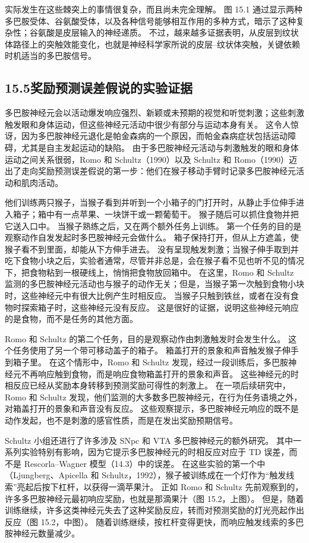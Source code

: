 \documentclass[UTF8,12pt,a4paper,fontset=fandol]{ctexart}
\begin{document}
实际发生在这些棘突上的事情很复杂，而且尚未完全理解。
图 15.1 通过显示两种多巴胺受体、谷氨酸受体，以及各种信号能够相互作用的多种方式，暗示了这种复杂性；谷氨酸是皮层输入的神经递质。
不过，越来越多证据表明，从皮层到纹状体路径上的突触效能变化，也就是神经科学家所说的皮层--纹状体突触，关键依赖时机适当的多巴胺信号。

\subsection*{15.5\quad 奖励预测误差假说的实验证据}

多巴胺神经元会以活动爆发响应强烈、新颖或未预期的视觉和听觉刺激；这些刺激触发眼和身体运动，但这些神经元活动中很少有部分与运动本身有关。
这令人惊讶，因为多巴胺神经元退化是帕金森病的一个原因，而帕金森病症状包括运动障碍，尤其是自主发起运动的缺陷。
由于多巴胺神经元活动与刺激触发的眼和身体运动之间关系很弱，Romo 和 Schultz（1990）以及 Schultz 和 Romo（1990）迈出了走向奖励预测误差假说的第一步：他们在猴子移动手臂时记录多巴胺神经元活动和肌肉活动。

他们训练两只猴子，当猴子看到并听到一个小箱子的门打开时，从静止手位伸手进入箱子；箱中有一点苹果、一块饼干或一颗葡萄干。
猴子随后可以抓住食物并把它送入口中。
当猴子熟练之后，又在两个额外任务上训练。
第一个任务的目的是观察动作自发发起时多巴胺神经元会做什么。
箱子保持打开，但从上方遮盖，使猴子看不到里面，却能从下方伸手进去。
没有呈现触发刺激；当猴子伸手取到并吃下食物小块之后，实验者通常，尽管并非总是，会在猴子看不见也听不见的情况下，把食物粘到一根硬线上，悄悄把食物放回箱中。
在这里，Romo 和 Schultz 监测的多巴胺神经元活动也与猴子的动作无关；但是，当猴子第一次触到食物小块时，这些神经元中有很大比例产生时相反应。
当猴子只触到铁丝，或者在没有食物时探索箱子时，这些神经元没有反应。
这是很好的证据，说明这些神经元响应的是食物，而不是任务的其他方面。

Romo 和 Schultz 的第二个任务，目的是观察动作由刺激触发时会发生什么。
这个任务使用了另一个带可移动盖子的箱子。
箱盖打开的景象和声音触发猴子伸手到箱子里。
在这个情形中，Romo 和 Schultz 发现，经过一段训练后，多巴胺神经元不再响应触到食物，而是响应食物箱盖打开的景象和声音。
这些神经元的时相反应已经从奖励本身转移到预测奖励可得性的刺激上。
在一项后续研究中，Romo 和 Schultz 发现，他们监测的大多数多巴胺神经元，在行为任务语境之外，对箱盖打开的景象和声音没有反应。
这些观察提示，多巴胺神经元响应的既不是动作发起，也不是刺激的感官性质，而是在发出奖励预期信号。

Schultz 小组还进行了许多涉及 SNpc 和 VTA 多巴胺神经元的额外研究。
其中一系列实验特别有影响，因为它提示多巴胺神经元的时相反应对应于 TD 误差，而不是 Rescorla--Wagner 模型（14.3）中的误差。
在这些实验的第一个中（Ljungberg、Apicella 和 Schultz，1992），猴子被训练成在一个灯作为“触发线索”亮起后按下杠杆，以获得一滴苹果汁。
正如 Romo 和 Schultz 先前观察到的，许多多巴胺神经元最初响应奖励，也就是那滴果汁（图 15.2，上图）。
但是，随着训练继续，许多这类神经元失去了这种奖励反应，转而对预测奖励的灯光亮起作出反应（图 15.2，中图）。
随着训练继续，按杠杆变得更快，而响应触发线索的多巴胺神经元数量减少。
\end{document}
